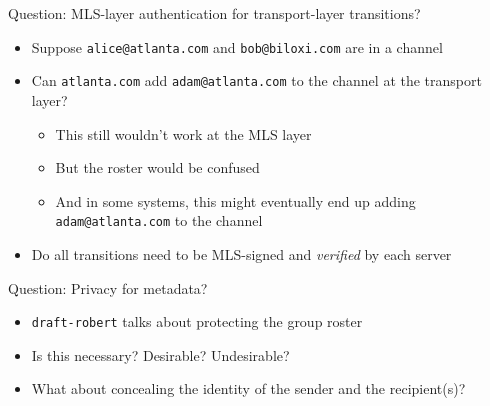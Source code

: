 \documentclass[helvetica]{beamer}
\begin{document}
\begin{frame}{Question: MLS-layer authentication for transport-layer transitions?}
  \begin{itemize}
  \item Suppose \texttt{alice@atlanta.com} and \texttt{bob@biloxi.com} are in a channel
  \item Can \texttt{atlanta.com} add \texttt{adam@atlanta.com} to the channel at the transport layer?
    \begin{itemize}
    \item This still wouldn't work at the MLS layer
    \item But the roster would be confused
    \item And in some systems, this might eventually end up adding \texttt{adam@atlanta.com} to the channel
    \end{itemize}
    
  \item Do all transitions need to be MLS-signed and \emph{verified} by each server
  \end{itemize}
\end{frame}

\begin{frame}{Question: Privacy for metadata?}

  \begin{itemize}
  \item \texttt{draft-robert} talks about protecting the group roster
  \item Is this necessary? Desirable? Undesirable?
  \item What about concealing the identity of the sender and the recipient(s)?
  \end{itemize}
\end{frame}
\end{document}
